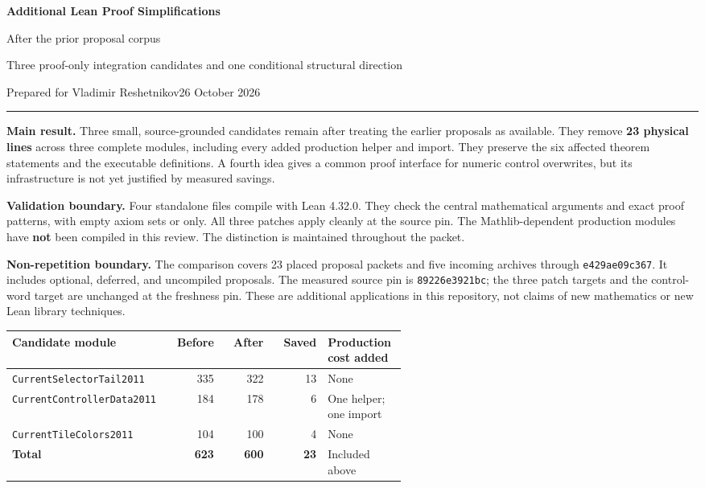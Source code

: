\documentclass[11pt]{article}
\newcommand{\name}[1]{\texttt{\detokenize{#1}}}
\newcommand{\breakname}[1]{\nolinkurl{#1}}
\newcommand{\sourcepin}{\texttt{89226e3921bc}}
\newcommand{\freshpin}{\texttt{e429ae09c367}}
\begin{document}
\thispagestyle{empty}
{\Large\color{navy}\bfseries Additional Lean Proof Simplifications\par}
\vspace{4pt}
{\large After the prior proposal corpus\par}
\vspace{9pt}
Three proof-only integration candidates and one conditional structural direction\par
Prepared for Vladimir Reshetnikov\hfill 26 October 2026
\vspace{12pt}
\hrule
\vspace{10pt}

\textbf{Main result.} Three small, source-grounded candidates remain after
treating the earlier proposals as available. They remove \textbf{23 physical
lines} across three complete modules, including every added production helper
and import. They preserve the six affected theorem statements and the executable
definitions. A fourth idea gives a common proof interface for numeric control
overwrites, but its infrastructure is not yet justified by measured savings.

\textbf{Validation boundary.} Four standalone files compile with Lean 4.32.0.
They check the central mathematical arguments and exact proof patterns, with
empty axiom sets or \name{propext} only. All three patches apply cleanly at the
source pin. The Mathlib-dependent production modules have \textbf{not} been
compiled in this review. The distinction is maintained throughout the packet.

\textbf{Non-repetition boundary.} The comparison covers 23 placed proposal
packets and five incoming archives through \freshpin. It includes optional,
deferred, and uncompiled proposals. The measured source pin is \sourcepin;
the three patch targets and the control-word target are unchanged at the
freshness pin. These are additional applications in this repository, not
claims of new mathematics or new Lean library techniques.

\begin{center}
\small
\begin{tabular}{p{0.37\linewidth}rrrp{0.20\linewidth}}
\toprule
Candidate module & Before & After & Saved & Production cost added\\
\midrule
\breakname{CurrentSelectorTail2011} & 335 & 322 & 13 & None\\
\breakname{CurrentControllerData2011} & 184 & 178 & 6 & One helper; one import\\
\breakname{CurrentTileColors2011} & 104 & 100 & 4 & None\\
\midrule
\textbf{Total} & \textbf{623} & \textbf{600} & \textbf{23} & Included above\\
\bottomrule
\end{tabular}
\end{center}
\end{document}
